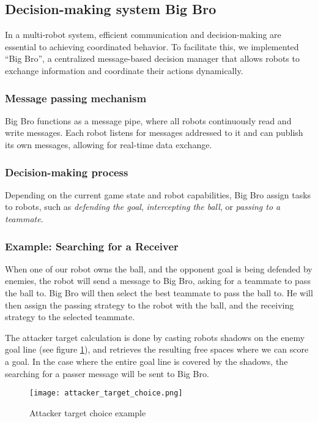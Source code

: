 \subsection{Decision-making system Big Bro}

In a multi-robot system, efficient communication and decision-making are essential to achieving coordinated behavior. To facilitate this, we implemented ``Big Bro'', a centralized message-based decision manager that allows robots to exchange information and coordinate their actions dynamically.  

\subsubsection{Message passing mechanism}

Big Bro functions as a message pipe, where all robots continuously read and write messages. Each robot listens for messages addressed to it and can publish its own messages, allowing for real-time data exchange.

\subsubsection{Decision-making process}

Depending on the current game state and robot capabilities, Big Bro assign tasks to robots, such as \textit{defending the goal}, \textit{intercepting the ball}, or \textit{passing to a teammate}.

\subsubsection{Example: Searching for a Receiver}

When one of our robot owns the ball, and the opponent goal is being defended by enemies, the robot will send a message to Big Bro, asking for a teammate to pass the ball to. Big Bro will then select the best teammate to pass the ball to. He will then assign the passing strategy to the robot with the ball, and the receiving strategy to the selected teammate.

The attacker target calculation is done by casting robots shadows on the enemy goal line (see figure \ref{fig:attacker_target_choice}), and retrieves the resulting free spaces where we can score a goal.
In the case where the entire goal line is covered by the shadows, the searching for a passer message will be sent to Big Bro.
\begin{figure}
\centering
    \texttt{[image: attacker\_target\_choice.png]}
    \caption{Attacker target choice example}
    \label{fig:attacker_target_choice}
\end{figure}


